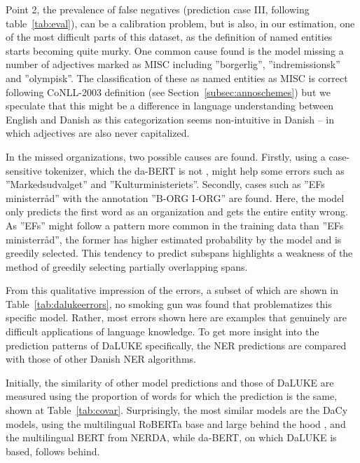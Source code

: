 \documentclass[main.tex]{subfiles}
\begin{document}
Point 2, the prevalence of false negatives (prediction case III, following table~\ref{tab:eval}), can be a calibration problem,
but is also, in our estimation, one of the most difficult parts of this dataset, as the definition of named entities starts becoming quite murky.
One common cause found is the model missing a number of adjectives marked as MISC including ''borgerlig'', ''indremissionsk'' and ''olympisk''.
The classification of these as named entities as MISC is correct following CoNLL-2003 definition (see Section~\ref{subsec:annoschemes}) but we speculate that this might be a difference in language understanding between English and Danish as this categorization seems non-intuitive in Danish -- in which adjectives are also never capitalized.

In the missed organizations, two possible causes are found.
Firstly, using a case-sensitive tokenizer, which the da-BERT is not \cite{botxo2019dabert}, might help some errors such as ''Markedsudvalget'' and ''Kulturministeriets''.
Secondly, cases such as ''EFs ministerråd'' with the annotation ''B-ORG I-ORG'' are found.
Here, the model only predicts the first word as an organization and gets the entire entity wrong.
As ''EFs'' might follow a pattern more common in the training data than ''EFs ministerråd'', the former has higher estimated probability by the model and is greedily selected.
This tendency to predict subspans highlights a weakness of the method of greedily selecting partially overlapping spans.

From this qualitative impression of the errors, a subset of which are shown in Table~\ref{tab:dalukeerrors}, no smoking gun was found that problematizes this specific model.
Rather, most errors shown here are examples that genuinely are difficult applications of language knowledge.
To get more insight into the prediction patterns of DaLUKE specifically, the NER predictions are compared with those of other Danish NER algorithms.

Initially, the similarity of other model predictions and those of DaLUKE are measured using the proportion of words for which the prediction is the same, shown at Table~\ref{tab:covar}.
Surprisingly, the most similar models are the DaCy models, using the multilingual RoBERTa base and large behind the hood \cite{enevoldsen2020dacy}, and the multilingual BERT from NERDA, while da-BERT, on which DaLUKE is based, follows behind.
\end{document}
